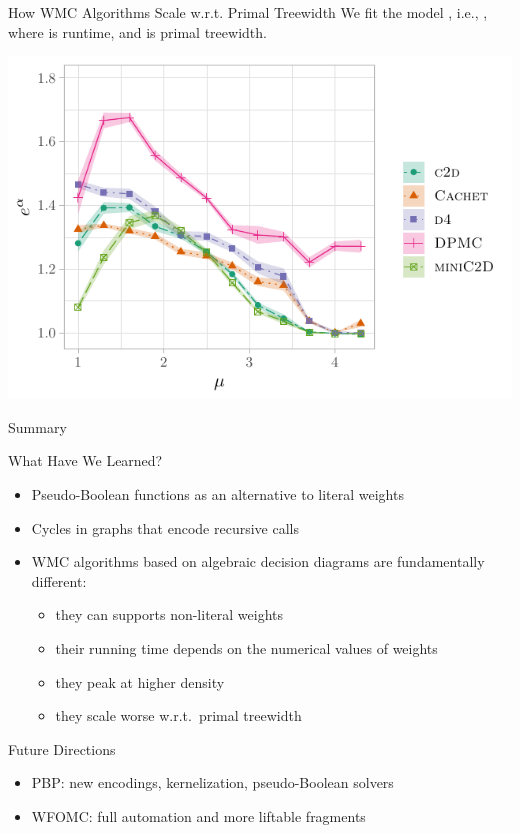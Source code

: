 \documentclass{beamer}
\begin{document}
 \begin{frame}{How WMC Algorithms Scale w.r.t. Primal Treewidth}
  We fit the model , i.e.,
  , where  is
  \alert{runtime}, and  is \alert{primal treewidth}.

  \centering
  \includegraphics{linearbase.pdf}
\end{frame}

\begin{frame}{Summary}
  \begin{block}{What Have We Learned?}
    \begin{itemize}
      \item Pseudo-Boolean functions as an alternative to literal weights
      \item Cycles in graphs that encode recursive calls
      \item WMC algorithms based on algebraic decision diagrams are fundamentally different:
      \begin{itemize}
        \item they can supports non-literal weights
        \item their running time depends on the numerical values of weights
        \item they peak at higher density
        \item they scale worse w.r.t.\ primal treewidth
      \end{itemize}
    \end{itemize}
  \end{block}
  \begin{block}{Future Directions}
    \begin{itemize}
      \item PBP\@: new encodings, kernelization, pseudo-Boolean solvers
      \item WFOMC\@: full automation and more liftable fragments
    \end{itemize}
  \end{block}
\end{frame}
\end{document}
